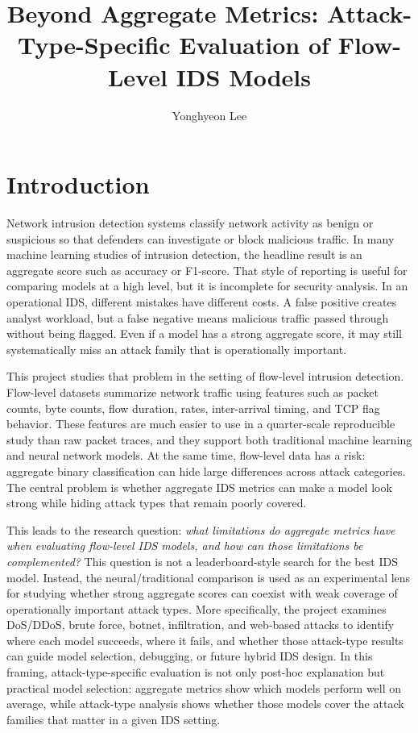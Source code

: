 \documentclass[sigconf,nonacm]{acmart}
\title{Beyond Aggregate Metrics: Attack-Type-Specific Evaluation of Flow-Level IDS Models}
\author{Yonghyeon Lee}
\affiliation{%
  \country{}
}
\begin{document}
\maketitle

\section{Introduction}

Network intrusion detection systems classify network activity as benign or suspicious so that defenders can investigate or block malicious traffic.
In many machine learning studies of intrusion detection, the headline result is an aggregate score such as accuracy or F1-score.
That style of reporting is useful for comparing models at a high level, but it is incomplete for security analysis.
In an operational IDS, different mistakes have different costs.
A false positive creates analyst workload, but a false negative means malicious traffic passed through without being flagged.
Even if a model has a strong aggregate score, it may still systematically miss an attack family that is operationally important.

This project studies that problem in the setting of flow-level intrusion detection.
Flow-level datasets summarize network traffic using features such as packet counts, byte counts, flow duration, rates, inter-arrival timing, and TCP flag behavior.
These features are much easier to use in a quarter-scale reproducible study than raw packet traces, and they support both traditional machine learning and neural network models.
At the same time, flow-level data has a risk: aggregate binary classification can hide large differences across attack categories.
The central problem is whether aggregate IDS metrics can make a model look strong while hiding attack types that remain poorly covered.

This leads to the research question:
\emph{what limitations do aggregate metrics have when evaluating flow-level IDS models, and how can those limitations be complemented?}
This question is not a leaderboard-style search for the best IDS model.
Instead, the neural/traditional comparison is used as an experimental lens for studying whether strong aggregate scores can coexist with weak coverage of operationally important attack types.
More specifically, the project examines DoS/DDoS, brute force, botnet, infiltration, and web-based attacks to identify where each model succeeds, where it fails, and whether those attack-type results can guide model selection, debugging, or future hybrid IDS design.
In this framing, attack-type-specific evaluation is not only post-hoc explanation but practical model selection: aggregate metrics show which models perform well on average, while attack-type analysis shows whether those models cover the attack families that matter in a given IDS setting.
\end{document}
